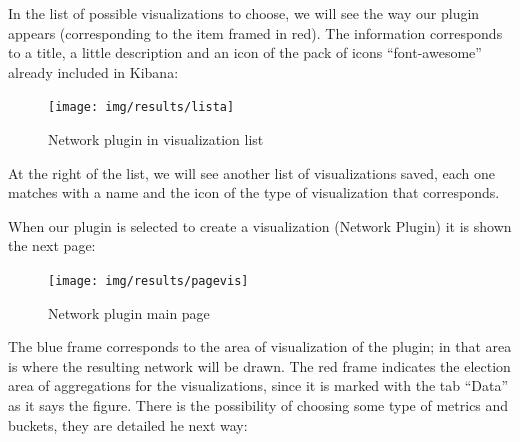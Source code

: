 \documentclass[a4paper, 12pt]{book}
\begin{document}
In the list of possible visualizations to choose, we will see the way our plugin appears (corresponding to the item framed in red). The information corresponds to a title, a little description and an icon of the pack of icons “font-awesome” already included in Kibana: 

\begin{figure}[H]
  \centering
  \texttt{[image: img/results/lista]}
  \caption{Network plugin in visualization list}
  \label{fig:listpluginsresults}
\end{figure}


At the right of the list, we will see another list of visualizations saved, each one matches with a name and the icon of the type of visualization that corresponds.

When our plugin is selected to create a visualization (Network Plugin) it is shown the next page: 

\begin{figure}[H]
  \centering
  \texttt{[image: img/results/pagevis]}
  \caption{Network plugin main page}
  \label{fig:pagevisnetwork}
\end{figure}

The blue frame corresponds to the area of visualization of the plugin; in  that area is where the resulting network will be drawn. The red frame indicates the election area of aggregations for the visualizations, since it is marked with the tab “Data” as it says the figure. There is the possibility of choosing some type of metrics and buckets, they are detailed he next way: 
\end{document}
